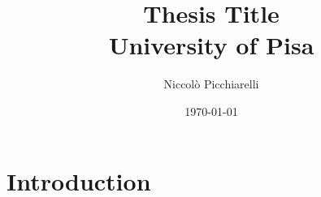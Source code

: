 \documentclass[a4paper]{book} %
\title{
	{Thesis Title}\\
	{\large University of Pisa}\\
}
\author{Niccolò Picchiarelli}
\date{\today}
\begin{document}
	
	\maketitle
	
	\chapter{Introduction}
	
	\begin{comment}
			\chapter{Implementation of interactions in simulations}
		\section{Previous Developments}
		\section{Steric Interactions}
		\subsection{All to All}
		\subsection{Range}s
		\section{Aligning Interactions}
		
		\chapter{Analysis of Structure and Dynamics}
		\section{Radial Distribution Function}
		
		\chapter{Inference of interaction potentials from data}
		\chapter{Conclusion}
	\end{comment}

	\printbibliography
\end{document}
